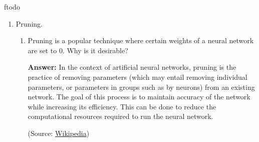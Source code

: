 ƒtodo\documentclass{article}
\newenvironment{QandA}{\begin{enumerate}[label=\arabic*.]}{\end{enumerate}}
\newenvironment{InnerQandA}{\begin{enumerate}[label=\roman*.]}{\end{enumerate}}
\newenvironment{answer}{\par\normalfont \textbf{Answer:}}{}
\begin{document}
\begin{QandA}
\begin{InnerQandA}
\begin{answer}
            (See more \href{https://datascience.stackexchange.com/questions/5706/what-is-the-dying-relu-problem-in-neural-networks}{here})
        \end{answer}

        \item How do we detect them in our neural network?
        \begin{answer}
            By observing the distribution of outputted values over time, we can detect neurons that have peak highly at certain values (e.g. 0).
        \end{answer}

        \item How to prevent them?
        \begin{answer}
            One way to tackle dead ReLU's is to instead use Leaky ReLU's, as they have small, but constant gradient for large negative inputs. 
        \end{answer}
    \end{InnerQandA}

    \item Pruning.
    \begin{InnerQandA}
        \item Pruning is a popular technique where certain weights of a neural network are set to 0. Why is it desirable?
        \begin{answer}
            In the context of artificial neural networks, pruning is the practice of removing parameters (which may entail removing individual parameters, or parameters in groups such as by neurons) from an existing network. The goal of this process is to maintain accuracy of the network while increasing its efficiency. This can be done to reduce the computational resources required to run the neural network.

            (Source: \href{https://en.wikipedia.org/wiki/Pruning\_(artificial\_neural\_network)}{Wikipedia})
        \end{answer}


\end{InnerQandA}
\end{QandA}
\end{document}
